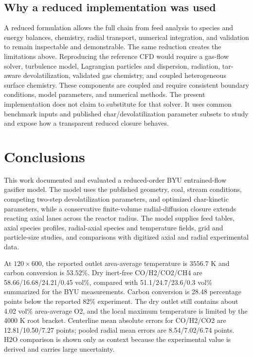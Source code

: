 \documentclass[journal]{IEEEtran}
\begin{document}
\subsection{Why a reduced implementation was used}
A reduced formulation allows the full chain from feed analysis to species and energy balances, chemistry, radial transport, numerical integration, and validation to remain inspectable and demonstrable. The same reduction creates the limitations above. Reproducing the reference CFD would require a gas-flow solver, turbulence model, Lagrangian particles and dispersion, radiation, tar-aware devolatilization, validated gas chemistry, and coupled heterogeneous surface chemistry. These components are coupled and require consistent boundary conditions, model parameters, and numerical methods. The present implementation does not claim to substitute for that solver. It uses common benchmark inputs and published char/devolatilization parameter subsets to study and expose how a transparent reduced closure behaves.

\section{Conclusions}
This work documented and evaluated a reduced-order BYU entrained-flow gasifier model. The model uses the published geometry, coal, stream conditions, competing two-step devolatilization parameters, and optimized char-kinetic parameters, while a conservative finite-volume radial-diffusion closure extends reacting axial lanes across the reactor radius. The model supplies feed tables, axial species profiles, radial-axial species and temperature fields, grid and particle-size studies, and comparisons with digitized axial and radial experimental data.

At \(120\times600\), the reported outlet area-average temperature is \(3556.7\) K and carbon conversion is \(53.52\%\). Dry inert-free CO/H2/CO2/CH4 are 58.66/16.68/24.21/0.45 vol\%, compared with 51.1/24.7/23.6/0.3 vol\% summarized for the BYU measurements. Carbon conversion is 28.48 percentage points below the reported 82\% experiment. The dry outlet still contains about 4.02 vol\% area-average O2, and the local maximum temperature is limited by the 4000 K root bracket. Centerline mean absolute errors for CO/H2/CO2 are 12.81/10.50/7.27 points; pooled radial mean errors are 8.54/7.02/6.74 points. H2O comparison is shown only as context because the experimental value is derived and carries large uncertainty.
\end{document}
